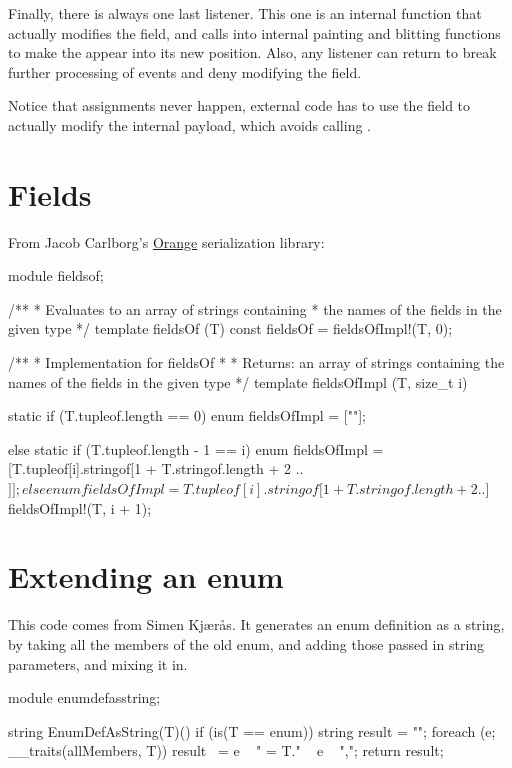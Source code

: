Finally, there is always one last listener. This one is an internal function that actually modifies the  field, and calls into internal painting and blitting functions to make the  appear into its new position. Also, any listener can return  to break further processing of events and deny modifying the field.

Notice that assignments never happen, external code has to use the  field to actually modify the internal payload, which avoids calling .

\section{Fields}

From Jacob Carlborg's \href{https://github.com/jacob-carlborg/orange}{Orange} serialization library:

\begin{dcode}
module fieldsof;

/**
 * Evaluates to an array of strings containing 
 * the names of the fields in the given type
 */
template fieldsOf (T)
{
	const fieldsOf = fieldsOfImpl!(T, 0);
}

/**
 * Implementation for fieldsOf
 * 
 * Returns: an array of strings containing the names of the fields in the given type
 */
template fieldsOfImpl (T, size_t i)
{
    static if (T.tupleof.length == 0)
        enum fieldsOfImpl = [""];

    else static if (T.tupleof.length - 1 == i)
        enum fieldsOfImpl = [T.tupleof[i].stringof[1 + T.stringof.length + 2 .. $]];

    else
        enum fieldsOfImpl = T.tupleof[i].stringof[1 + T.stringof.length + 2 .. $] ~ fieldsOfImpl!(T, i + 1);
}
\end{dcode}

\section{Extending an enum}

This code comes from Simen Kj\ae r\r{a}s.  It generates an enum definition as a string, by taking all the members of the old enum, and adding those passed in string parameters, and mixing it in.

\begin{dcode}
module enumdefasstring;

string EnumDefAsString(T)() 
if (is(T == enum)) 
{
   string result = "";
   foreach (e; __traits(allMembers, T))
       result ~= e ~ " = T." ~ e ~ ",";
   return result;
}
\end{dcode}

